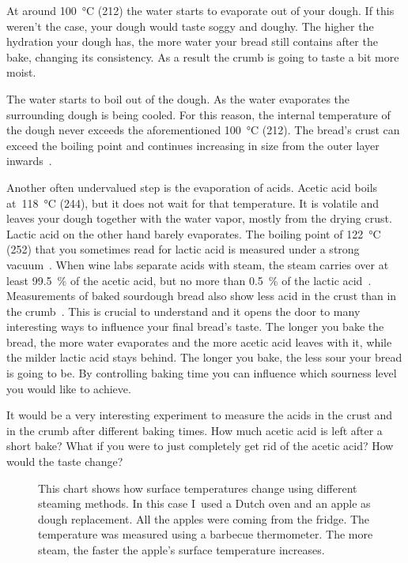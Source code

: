 At around  \qty{100}{\degreeCelsius} (\qty{212}{\degF}) the water starts to evaporate out of your
dough. If this weren't the case, your dough would taste soggy and
doughy. The higher the hydration your dough has, the more water your bread
still contains after the bake, changing its consistency.  As a result the
crumb is going to taste a bit more moist.

The water starts to boil out of the
dough. As the water evaporates the surrounding dough is being cooled.
For this reason, the internal temperature of the dough never exceeds the aforementioned
\qty{100}{\degreeCelsius} (\qty{212}{\degF}). The bread's crust can exceed the boiling point
and continues increasing in size from the outer layer inwards~\cite{bread+temperature+baking}.

Another often undervalued step is the evaporation of acids.
Acetic acid boils at~\qty{118}{\degreeCelsius} (\qty{244}{\degF}), but it
does not wait for that temperature. It is volatile and leaves your dough
together with the water vapor, mostly from the drying crust. Lactic acid on
the other hand barely evaporates. The boiling point of
\qty{122}{\degreeCelsius} (\qty{252}{\degF}) that you sometimes read for
lactic acid is measured under a strong vacuum~\cite{pubchem+lactic+acid}.
When wine labs separate acids with steam, the steam carries over at least
\qty{99.5}{\percent} of the acetic acid, but no more than
\qty{0.5}{\percent} of the lactic acid~\cite{oiv+volatile+acidity}.
Measurements of baked sourdough bread also show less acid in the crust than
in the crumb~\cite{vriesekoop+spent+grain}.
This is crucial to understand and it opens the door to many interesting
ways to influence your final bread's taste. The longer you bake the bread,
the more water evaporates and the more acetic acid leaves with it, while the
milder lactic acid stays behind. The longer you bake, the less sour your
bread is going to be. By controlling baking time you can influence which
sourness level you would like to achieve.

It would be a very interesting experiment to measure the acids in the crust
and in the crumb after different baking times. How much acetic acid is left
after a short bake? What if you were to just completely get rid of the acetic
acid? How would the taste change?

\begin{figure}[!htb]
  
  \caption[Surface temperature for different steaming methods]{This
      chart shows how surface temperatures change using different steaming
      methods. In this case I~used a Dutch oven and an apple as dough
      replacement. All the apples were coming from the fridge. The temperature
      was measured using a barbecue thermometer.  The more steam, the faster
      the apple's surface temperature increases.}
\end{figure}

